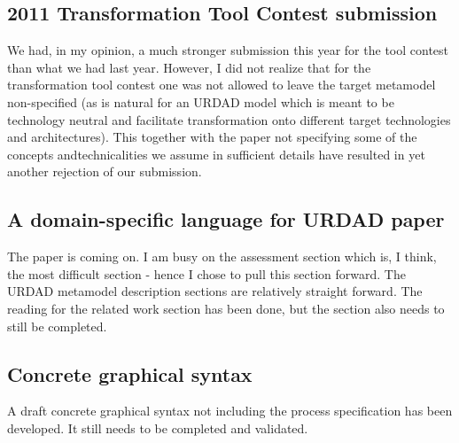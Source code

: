 \subsection{2011 Transformation Tool Contest submission}
We had, in my opinion, a much stronger submission this year for the tool contest than what we had last year. However, I did not realize that for the transformation tool contest one was not allowed to leave the target metamodel non-specified (as is natural for an URDAD model which is meant to be technology neutral and facilitate transformation onto different target technologies and architectures). This together with the paper not specifying some of the concepts andtechnicalities we assume in sufficient details have resulted in yet another rejection of our submission.

\subsection{A domain-specific language for URDAD paper}
The paper is coming on. I am busy on the assessment section which is, I think, the most difficult section - hence I chose to pull this section forward. The URDAD metamodel description sections are relatively straight forward. The reading for the related work section has been done, but the section also needs to still be completed.

\subsection{Concrete graphical syntax}
A draft concrete graphical syntax not including the process specification has been developed. It still needs to be completed and validated.